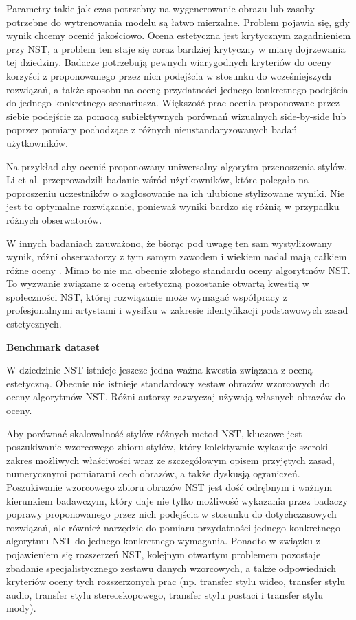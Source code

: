 \documentclass[12pt]{article}
\begin{document}
\indent

Parametry takie jak czas potrzebny na wygenerowanie obrazu lub zasoby potrzebne do wytrenowania modelu są łatwo mierzalne. Problem pojawia się, gdy wynik chcemy ocenić jakościowo. Ocena estetyczna jest krytycznym zagadnieniem przy NST, a problem ten staje się coraz bardziej krytyczny w miarę dojrzewania tej dziedziny. Badacze potrzebują pewnych wiarygodnych kryteriów do oceny korzyści z proponowanego przez nich podejścia w stosunku do wcześniejszych rozwiązań, a także sposobu na ocenę przydatności jednego konkretnego podejścia do jednego konkretnego scenariusza. Większość prac ocenia proponowane przez siebie podejście za pomocą subiektywnych porównań wizualnych side-by-side lub poprzez pomiary pochodzące z różnych nieustandaryzowanych badań użytkowników.

Na przykład aby ocenić proponowany uniwersalny algorytm przenoszenia stylów, Li et al. przeprowadzili badanie wśród użytkowników, które polegało na poproszeniu uczestników o zagłosowanie na ich ulubione stylizowane wyniki. Nie jest to optymalne rozwiązanie, ponieważ wyniki bardzo się różnią w przypadku różnych obserwatorów.

W innych badaniach zauważono, że biorąc pod uwagę ten sam wystylizowany wynik, różni obserwatorzy z tym samym zawodem i wiekiem nadal mają całkiem różne oceny \cite{22}. Mimo to nie ma obecnie złotego standardu oceny algorytmów NST. To wyzwanie związane z oceną estetyczną pozostanie otwartą kwestią w społeczności NST, której rozwiązanie może wymagać współpracy z profesjonalnymi artystami i wysiłku w zakresie identyfikacji podstawowych zasad estetycznych.

\noindent\textbf{Benchmark dataset}

W dziedzinie NST istnieje jeszcze jedna ważna kwestia związana z oceną estetyczną. Obecnie nie istnieje standardowy zestaw obrazów wzorcowych do oceny algorytmów NST. Różni autorzy zazwyczaj używają własnych obrazów do oceny.

Aby porównać skalowalność stylów różnych metod NST, kluczowe jest poszukiwanie wzorcowego zbioru stylów, który kolektywnie wykazuje szeroki zakres możliwych właściwości wraz ze szczegółowym opisem przyjętych zasad, numerycznymi pomiarami cech obrazów, a także dyskusją ograniczeń. Poszukiwanie wzorcowego zbioru obrazów NST jest dość odrębnym i ważnym kierunkiem badawczym, który daje nie tylko możliwość wykazania przez badaczy poprawy proponowanego przez nich podejścia w stosunku do dotychczasowych rozwiązań, ale również narzędzie do pomiaru przydatności jednego konkretnego algorytmu NST do jednego konkretnego wymagania. Ponadto w związku z pojawieniem się rozszerzeń NST, kolejnym otwartym problemem pozostaje zbadanie specjalistycznego zestawu danych wzorcowych, a także odpowiednich kryteriów oceny tych rozszerzonych prac (np. transfer stylu wideo, transfer stylu audio, transfer stylu stereoskopowego, transfer stylu postaci i transfer stylu mody).
\end{document}
